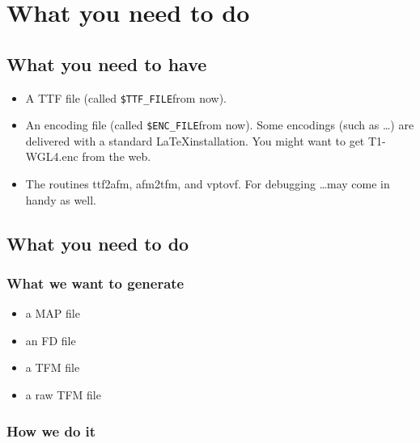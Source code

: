\documentclass[10pt]{scrartcl}
\newcommand{\ttffile}{\texttt{\$TTF\_FILE}}
\newcommand{\encfile}{\texttt{\$ENC\_FILE}}
\begin{document}
\section*{What you need to do}

\subsection*{What you need to have}
\begin{itemize}
\item A TTF file (called \ttffile from now).
\item An encoding file (called \encfile from now). Some encodings (such as \dots) are delivered  with a standard \LaTeX installation. You might want to get T1-WGL4.enc from the web.
\item The routines ttf2afm, afm2tfm, and vptovf. For debugging \dots may come in handy as well.
\end{itemize}

\subsection*{What you need to do}

\subsubsection*{What we want to generate}
\begin{itemize}
\item a MAP file
\item an FD file
\item a TFM file
\item a raw TFM file
\end{itemize}

\subsubsection*{How we do it}
\end{document}
